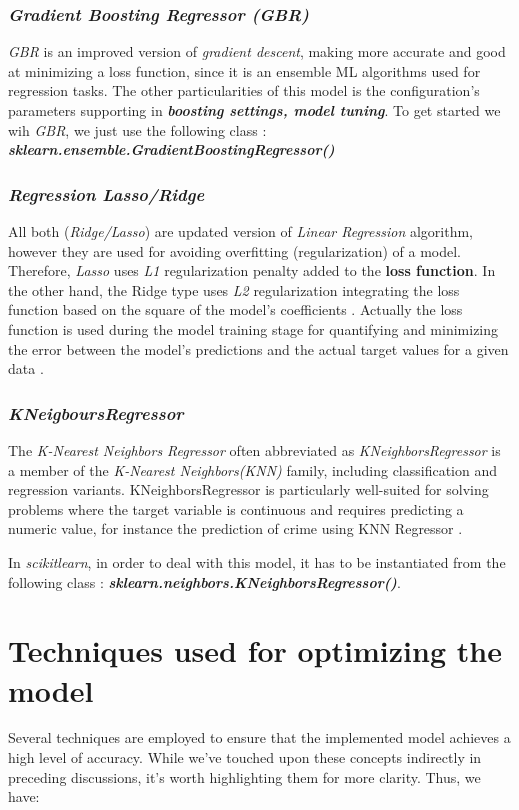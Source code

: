 \documentclass[12pt,a4paper]{report}
\begin{document}
\subsubsection{\textit{Gradient Boosting Regressor (GBR)}}
\textit{GBR} is an improved version of \textit{gradient descent}, making more accurate and good at minimizing a loss function, since it is an ensemble ML algorithms used for regression tasks. 
The other particularities of this model is the configuration's parameters supporting in \textbf{\textit{boosting settings, model tuning}}. 
To get started we wih \textit{GBR}, we just use the following class : \textit{\textbf{sklearn.ensemble.GradientBoostingRegressor()}}

\subsubsection{\textit{Regression Lasso/Ridge}}
 All both (\textit{Ridge/Lasso}) are updated version of \textit{Linear Regression} algorithm, however they are used for avoiding overfitting (regularization) of a model. Therefore, \textit{Lasso} uses \textit{L1} regularization penalty added to the \textbf{loss function}. 
 In the other hand, the Ridge type uses \textit{L2} regularization integrating the loss function based on the square of the model's coefficients \cite{hazan2011optimal}. 
 Actually the loss function is used during the model training stage for quantifying and minimizing the error between the model's predictions and the actual target values for a given data \cite{wang2020comprehensive}.  
 
 \subsubsection{\textit{KNeigboursRegressor}}
 The \textit{K-Nearest Neighbors Regressor} often abbreviated as \textit{KNeighborsRegressor} is a member of the \textit{K-Nearest Neighbors(KNN)} family, including classification and regression variants. KNeighborsRegressor is particularly well-suited for solving problems where the target variable is continuous and requires predicting a numeric value, for instance the prediction of crime using KNN Regressor \cite{alsayadi2022improving}.
 
 In \textit{scikitlearn}, in order to deal with this model, it has to be instantiated from the following class : \newline \textit{\textbf{sklearn.neighbors.KNeighborsRegressor()}}. 
 
\section{Techniques used for optimizing the model} 
Several techniques are employed to ensure that the implemented model achieves a high level of accuracy. While we've touched upon these concepts indirectly in preceding discussions, it's worth highlighting them for more clarity. Thus, we have:
\end{document}

